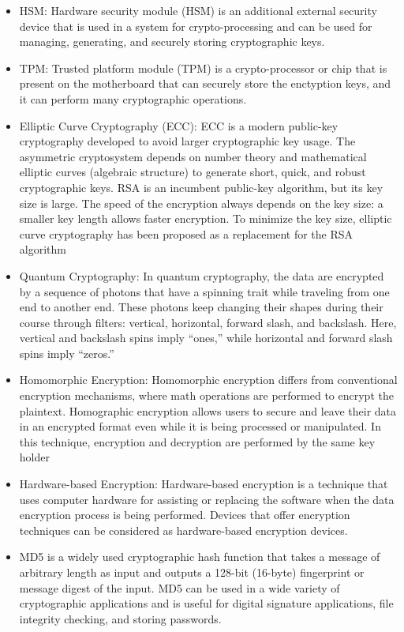 \begin{itemize}
    \item HSM: Hardware security module (HSM) is an additional external security device that is used in a system for crypto-processing and can be used for managing, generating, and securely storing cryptographic keys.
    \item TPM: Trusted platform module (TPM) is a crypto-processor or chip that is present on the motherboard that can securely store the enctyption keys, and it can perform many cryptographic operations.
    \item Elliptic Curve Cryptography (ECC): ECC is a modern public-key cryptography developed to avoid larger cryptographic key usage. The asymmetric cryptosystem depends on number theory and mathematical elliptic curves (algebraic structure) to generate short, quick, and robust cryptographic keys. RSA is an incumbent public-key algorithm, but its key size is large. The speed of the encryption always depends on the key size: a smaller key length allows faster encryption. To minimize the key size, elliptic curve cryptography has been proposed as a replacement for the RSA algorithm
    \item Quantum Cryptography: In quantum cryptography, the data are encrypted by a sequence of photons that have a spinning trait while traveling from one end to another end. These photons keep changing their shapes during their course through filters: vertical, horizontal, forward slash, and backslash. Here, vertical and backslash spins imply “ones,” while horizontal and forward slash spins imply “zeros.”
    \item Homomorphic Encryption: Homomorphic encryption differs from conventional encryption mechanisms, where math operations are performed to encrypt the plaintext. Homographic encryption allows users to secure and leave their data in an encrypted format even while it is being processed or manipulated. In this technique, encryption and decryption are performed by the same key holder
    \item Hardware-based Encryption: Hardware-based encryption is a technique that uses computer hardware for assisting or replacing the software when the data encryption process is being performed. Devices that offer encryption techniques can be considered as hardware-based encryption devices.
    \item MD5 is a widely used cryptographic hash function that takes a message of arbitrary length as input and outputs a 128-bit (16-byte) fingerprint or message digest of the input. MD5 can be used in a wide variety of cryptographic applications and is useful for digital signature applications, file integrity checking, and storing passwords.

\end{itemize}
